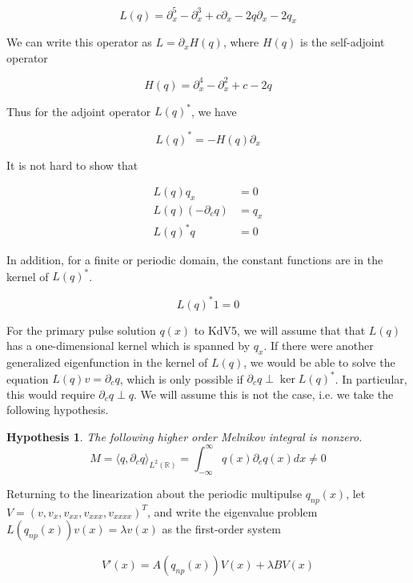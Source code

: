 \documentclass[12pt]{article}
\def\R{{\mathbb R}}
\newtheorem{hypothesis}{Hypothesis}
\begin{document}
\begin{equation}
L(q) = \partial_x^5 - \partial_x^3 + c \partial_x
 - 2 q \partial_x - 2 q_x
\end{equation}

We can write this operator as $L = \partial_x H(q)$, where $H(q)$ is the self-adjoint operator

\begin{equation}
H(q) = \partial_x^4 - \partial_x^2 + c - 2 q
\end{equation}

Thus for the adjoint operator $L(q)^*$, we have

\begin{equation}
L(q)^* = -H(q) \partial_x
\end{equation}

It is not hard to show that

\begin{align*}
L(q)q_x &= 0 \\
L(q)(-\partial_c q) &= q_x \\
L(q)^* q &= 0
\end{align*}

In addition, for a finite or periodic domain, the constant functions are in the kernel of $L(q)^*$.

\[
L(q)^* 1 = 0
\]

For the primary pulse solution $q(x)$ to KdV5, we will assume that that $L(q)$ has a one-dimensional kernel which is spanned by $q_x$. If there were another generalized eigenfunction in the kernel of $L(q)$, we would be able to solve the equation $L(q) v = \partial_c q$, which is only possible if $\partial_c q \perp \ker L(q)^*$. In particular, this would require $\partial_c q \perp q$. We will assume this is not the case, i.e. we take the following hypothesis.

\begin{hypothesis}\label{Melnikovnonzero}
The following higher order Melnikov integral is nonzero.
\[
M = \langle q, \partial_c q \rangle_{L^2(\R)} 
= \int_{-\infty}^\infty q(x) \partial_c q(x) dx \neq 0
\]
\end{hypothesis}

Returning to the linearization about the periodic multipulse $q_{np}(x)$, let $V = (v, v_x, v_{xx}, v_{xxx}, v_{xxxx})^T$, and write the eigenvalue problem $L(q_{np}(x))v(x) = \lambda v(x)$ as the first-order system

\begin{align*}
V'(x) = A(q_{np}(x)) V(x) + \lambda B V(x)
\end{align*}
\end{document}
